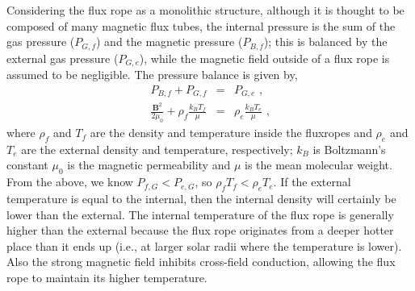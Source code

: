 Considering the  flux rope as a monolithic structure, although it is thought to be composed of many magnetic flux tubes, the internal pressure is the sum of the gas pressure ($P_{G,f}$) and the magnetic pressure ($P_{B,f}$); this is balanced by the external gas pressure ($P_{G,e}$), while the magnetic field outside of a flux rope is assumed to be negligible. The pressure balance is given by,
\begin{eqnarray}\label{pressbalance}
P_{B,f} + P_{G,f} &=& P_{G,e} \mbox{ ,} \\
\frac{\mathbf{B}^{2}}{2\mu_0} + \rho_{f} \frac{k_{B} T_{f}}{\mu} &=& \rho_{e}\frac{k_{B} T_{e}}{\mu} \mbox{ ,}
\end{eqnarray}
where $\rho_{f}$ and $T_{f}$ are the density and temperature inside the \glspl{fluxrope} and $\rho_{e}$ and $T_{e}$ are the external density and temperature, respectively; $k_{B}$ is Boltzmann's constant $\mu_0$ is the magnetic permeability and $\mu$ is the mean molecular weight. From the above, we know $P_{f,G} < P_{e,G}$, so $\rho_{f} T_{f} < \rho_{e} T_{e}$. If the external temperature is equal to the internal, then the internal density will certainly be lower than the external. The internal temperature of the flux rope is generally higher than the external because the flux rope originates from a deeper hotter place than it ends up (i.e., at larger solar radii where the temperature is lower). Also the strong magnetic field inhibits cross-field conduction, allowing the flux rope to maintain its higher temperature. %


